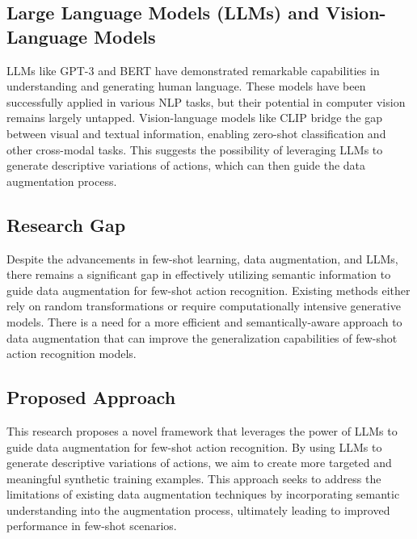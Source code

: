 \subsection{Large Language Models (LLMs) and Vision-Language Models} LLMs like GPT-3 \cite{radford2021learning} and BERT \cite{devlin2018bert} have demonstrated remarkable capabilities in understanding and generating human language. These models have been successfully applied in various NLP tasks, but their potential in computer vision remains largely untapped. Vision-language models like CLIP \cite{radford2021learning} bridge the gap between visual and textual information, enabling zero-shot classification and other cross-modal tasks. This suggests the possibility of leveraging LLMs to generate descriptive variations of actions, which can then guide the data augmentation process.

\subsection{Research Gap} 
Despite the advancements in few-shot learning, data augmentation, and LLMs, there remains a significant gap in effectively utilizing semantic information to guide data augmentation for few-shot action recognition. Existing methods either rely on random transformations or require computationally intensive generative models. There is a need for a more efficient and semantically-aware approach to data augmentation that can improve the generalization capabilities of few-shot action recognition models.

\subsection{Proposed Approach} This research proposes a novel framework that leverages the power of LLMs to guide data augmentation for few-shot action recognition. By using LLMs to generate descriptive variations of actions, we aim to create more targeted and meaningful synthetic training examples. This approach seeks to address the limitations of existing data augmentation techniques by incorporating semantic understanding into the augmentation process, ultimately leading to improved performance in few-shot scenarios.